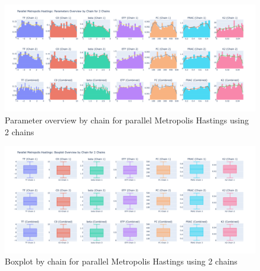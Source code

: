 \begin{figure}[H]
    \centering
    \includegraphics[width=.6\textwidth]{figures/parallel_mh/param_overview_2.png}
    \captionsetup{width=.8\textwidth}
    \caption{Parameter overview by chain for parallel Metropolis Hastings using 2 chains}
    \label{fig:enter-label}
\end{figure}

\begin{figure}[H]
    \centering
    \includegraphics[width=.6\textwidth]{figures/parallel_mh/boxplot_2.png}
    \captionsetup{width=.8\textwidth}
    \caption{Boxplot by chain for parallel Metropolis Hastings using 2 chains}
    \label{fig:enter-label}
\end{figure}